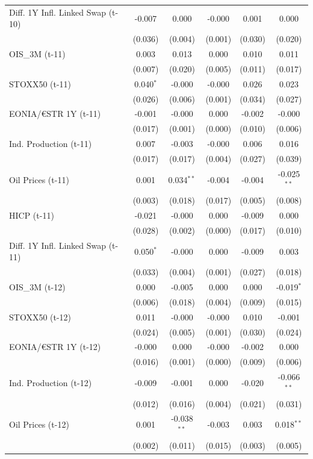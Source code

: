 \begin{longtable}[t]{lccccc}
Diff. 1Y Infl. Linked Swap (t-10) & -0.007 & 0.000 & -0.000 & 0.001 & 0.000\\
 & (0.036) & (0.004) & (0.001) & (0.030) & (0.020)\\
OIS\_3M (t-11) & 0.003 & 0.013 & 0.000 & 0.010 & 0.011\\
 & (0.007) & (0.020) & (0.005) & (0.011) & (0.017)\\
STOXX50 (t-11) & 0.040$^{*}$ & -0.000 & -0.000 & 0.026 & 0.023\\
 & (0.026) & (0.006) & (0.001) & (0.034) & (0.027)\\
EONIA/€STR 1Y (t-11) & -0.001 & -0.000 & 0.000 & -0.002 & -0.000\\
 & (0.017) & (0.001) & (0.000) & (0.010) & (0.006)\\
Ind. Production (t-11) & 0.007 & -0.003 & -0.000 & 0.006 & 0.016\\
 & (0.017) & (0.017) & (0.004) & (0.027) & (0.039)\\
Oil Prices (t-11) & 0.001 & 0.034$^{**}$ & -0.004 & -0.004 & -0.025$^{**}$\\
 & (0.003) & (0.018) & (0.017) & (0.005) & (0.008)\\
HICP (t-11) & -0.021 & -0.000 & 0.000 & -0.009 & 0.000\\
 & (0.028) & (0.002) & (0.000) & (0.017) & (0.010)\\
Diff. 1Y Infl. Linked Swap (t-11) & 0.050$^{*}$ & -0.000 & 0.000 & -0.009 & 0.003\\
 & (0.033) & (0.004) & (0.001) & (0.027) & (0.018)\\
OIS\_3M (t-12) & 0.000 & -0.005 & 0.000 & 0.000 & -0.019$^{*}$\\
 & (0.006) & (0.018) & (0.004) & (0.009) & (0.015)\\
STOXX50 (t-12) & 0.011 & -0.000 & -0.000 & 0.010 & -0.001\\
 & (0.024) & (0.005) & (0.001) & (0.030) & (0.024)\\
EONIA/€STR 1Y (t-12) & -0.000 & 0.000 & -0.000 & -0.002 & 0.000\\
 & (0.016) & (0.001) & (0.000) & (0.009) & (0.006)\\
Ind. Production (t-12) & -0.009 & -0.001 & 0.000 & -0.020 & -0.066$^{**}$\\
 & (0.012) & (0.016) & (0.004) & (0.021) & (0.031)\\
Oil Prices (t-12) & 0.001 & -0.038$^{**}$ & -0.003 & 0.003 & 0.018$^{**}$\\
 & (0.002) & (0.011) & (0.015) & (0.003) & (0.005)\\

\end{longtable}

